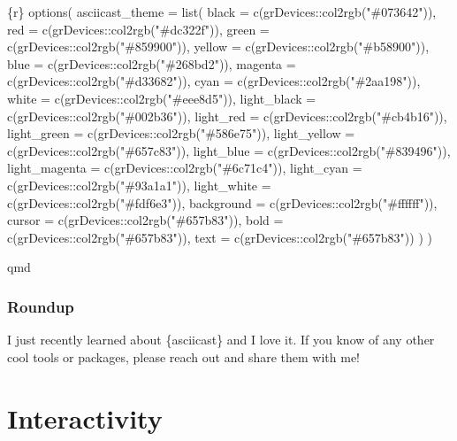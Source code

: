 \documentclass[
  letterpaper,
  DIV=11,
  numbers=noendperiod]{scrreprt}
\newenvironment{Shaded}{\begin{snugshade}}{\end{snugshade}}
\newcommand{\InformationTok}[1]{\textcolor[rgb]{0.37,0.37,0.37}{#1}}
\begin{document}
\begin{Shaded}
\begin{Highlighting}[]
\InformationTok{\textasciigrave{}\textasciigrave{}\textasciigrave{}\{r\}}
\InformationTok{options(}
\InformationTok{  asciicast\_theme = list(}
\InformationTok{    black         = c(grDevices::col2rgb("\#073642")),}
\InformationTok{    red           = c(grDevices::col2rgb("\#dc322f")),}
\InformationTok{    green         = c(grDevices::col2rgb("\#859900")),}
\InformationTok{    yellow        = c(grDevices::col2rgb("\#b58900")),}
\InformationTok{    blue          = c(grDevices::col2rgb("\#268bd2")),}
\InformationTok{    magenta       = c(grDevices::col2rgb("\#d33682")),}
\InformationTok{    cyan          = c(grDevices::col2rgb("\#2aa198")),}
\InformationTok{    white         = c(grDevices::col2rgb("\#eee8d5")),}
\InformationTok{    light\_black   = c(grDevices::col2rgb("\#002b36")),}
\InformationTok{    light\_red     = c(grDevices::col2rgb("\#cb4b16")),}
\InformationTok{    light\_green   = c(grDevices::col2rgb("\#586e75")),}
\InformationTok{    light\_yellow  = c(grDevices::col2rgb("\#657c83")),}
\InformationTok{    light\_blue    = c(grDevices::col2rgb("\#839496")),}
\InformationTok{    light\_magenta = c(grDevices::col2rgb("\#6c71c4")),}
\InformationTok{    light\_cyan    = c(grDevices::col2rgb("\#93a1a1")),}
\InformationTok{    light\_white   = c(grDevices::col2rgb("\#fdf6e3")),}
\InformationTok{    background    = c(grDevices::col2rgb("\#ffffff")),}
\InformationTok{    cursor        = c(grDevices::col2rgb("\#657b83")),}
\InformationTok{    bold          = c(grDevices::col2rgb("\#657b83")),}
\InformationTok{    text          = c(grDevices::col2rgb("\#657b83"))}
\InformationTok{  )}
\InformationTok{)}
\InformationTok{\textasciigrave{}\textasciigrave{}\textasciigrave{}}
\end{Highlighting}
\end{Shaded}

qmd

\section{Roundup}\label{roundup}

I just recently learned about \{asciicast\} and I love it. If you know
of any other cool tools or packages, please reach out and share them
with me!

\part{Interactivity}
\end{document}
